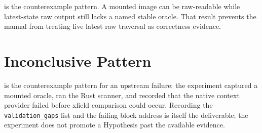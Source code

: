  is the
counterexample pattern. A mounted image can be raw-readable while latest-state
raw output still lacks a named stable oracle. That result prevents the manual
from treating live latest raw traversal as correctness evidence.

\section{Inconclusive Pattern}

 is the
counterexample pattern for an upstream failure: the experiment captured a
mounted oracle, ran the Rust scanner, and recorded that the native context
provider failed before xfield comparison could occur. Recording the
\texttt{validation\_gaps} list and the failing block address is itself the
deliverable; the experiment does not promote a Hypothesis past the available
evidence.
